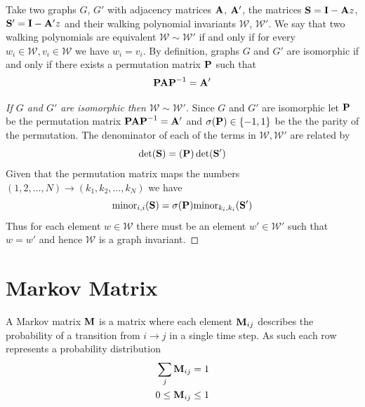 Take two graphs $G$, $G'$ with adjacency matrices ${\bf A}$, ${\bf A'}$, the matrices ${\bf S}={\bf I}-{\bf A}z$, ${\bf S}'={\bf I}-{\bf A'}z$ and their walking polynomial invariants $\mathcal{W}$, $\mathcal{W'}$. We say that two walking polynomials are equivalent $\mathcal{W} \sim \mathcal{W'}$ if and only if for every $w_i \in \mathcal{W}, v_i \in \mathcal{W}$ we have $w_i = v_i$. By definition, graphs $G$ and $G'$ are isomorphic if and only if there exists a permutation matrix ${\bf P}$ such that
\begin{equation}
  {\bf P A P} ^{-1} = \bf A'
\end{equation}
%
 \begin{proof}[If $G$ and $G'$ are isomorphic then $\mathcal{W} \sim \mathcal{W'}$] Since $G$ and $G'$ are isomorphic let ${\bf P}$ be the permutation matrix ${\bf P A P} ^{-1} = \bf A'$ and $\sigma({\bf P}) \in \{-1, 1\}$ be the the parity of the permutation. The denominator of each of the terms in $\mathcal{W}, \mathcal{W'}$ are related by
  \begin{equation}
    \det({\bf S}) = ({\bf P}) \det({\bf S'})
  \end{equation}
  Given that the permutation matrix maps the numbers $(1, 2, \ldots, N) \rightarrow (k_1, k_2, \ldots, k_N)$ we have
  \begin{equation}
    \text{minor}_{i, i} ({\bf S}) = \sigma({\bf P}) \text{minor}_{k_i, k_i}( {\bf S'} )
  \end{equation}
  Thus for each element $w \in \mathcal{W}$ there must be an element $w' \in \mathcal{W'}$ such that $w = w'$ and hence $\mathcal{W}$ is a graph invariant.
\end{proof}



\section{Markov Matrix}
\label{sec:markov_matrix}

A Markov matrix ${\bf M}$ is a matrix where each element ${\bf M}_{ij}$ describes the probability of a transition from $i \rightarrow j$ in a single time step. As such each row represents a probability distribution
\begin{align}
  \sum_j {\bf M}_{ij} & = 1 \\
  0 \leq {\bf M}_{ij} & \leq 1
\end{align}

